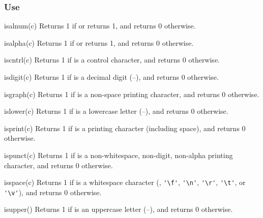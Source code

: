 \subsubsection*{Use}

\begin{defun}{isalnum}{(c)}
Returns 1 if  or  returns 1,
and returns 0 otherwise.
\end{defun}

\begin{defun}{isalpha}{(c)}
Returns 1 if  or  returns 1,
and returns 0 otherwise.
\end{defun}

\begin{defun}{iscntrl}{(c)}
Returns 1 if  is a control character,
and returns 0 otherwise.
\end{defun}

\begin{defun}{isdigit}{(c)}
Returns 1 if  is a decimal digit (--), and
returns 0 otherwise.
\end{defun}

\begin{defun}{isgraph}{(c)}
Returns 1 if  is a non-space printing character, and returns 0
otherwise.
\end{defun}

\begin{defun}{islower}{(c)}
Returns 1 if  is a lowercase letter (--),
and returns 0 otherwise.
\end{defun}

\begin{defun}{isprint}{(c)}
Returns 1 if  is a printing character (including space), and
returns 0 otherwise.
\end{defun}

\begin{defun}{ispunct}{(c)}
Returns 1 if  is a non-whitespace, non-digit, non-alpha
printing character, and returns 0 otherwise.
\end{defun}

\begin{defun}{isspace}{(c)}
Returns 1 if  is a whitespace character (,
\verb|'\f'|, \verb|'\n'|, \verb|'\r'|, \verb|'\t'|, or \verb|'\v'|),
and returns 0 otherwise.
\end{defun}

\begin{defun}{isupper}{()}
Returns 1 if  is an uppercase letter
(--), and returns 0 otherwise.
\end{defun}


